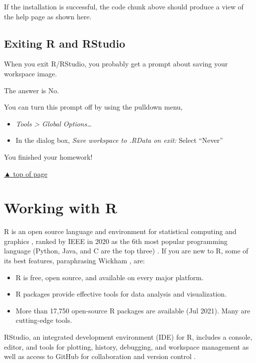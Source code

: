 \documentclass[
]{book}
\providecommand{\tightlist}{%
  \setlength{\itemsep}{0pt}\setlength{\parskip}{0pt}}
\begin{document}
If the installation is successful, the code chunk above should produce a view of the help page as shown here.

\hypertarget{exiting-r-and-rstudio}{%
\section{Exiting R and RStudio}\label{exiting-r-and-rstudio}}

When you exit R/RStudio, you probably get a prompt about saving your workspace image.

The answer is No.~

You can turn this prompt off by using the pulldown menu,

\begin{itemize}
\tightlist
\item
  \emph{Tools \textgreater{} Global Options\ldots{}}
\item
  In the dialog box, \emph{Save workspace to .RData on exit:} Select ``Never''
\end{itemize}

You finished your homework!

\protect\hyperlink{install-everything}{▲ top of page}

\hypertarget{work-with-R}{%
\chapter{Working with R}\label{work-with-R}}

R is an open source language and environment for statistical computing and graphics \citep{R-base}, ranked by IEEE in 2020 as the 6th most popular programming language (Python, Java, and C are the top three) \citep{Cass:2020}. If you are new to R, some of its best features, paraphrasing Wickham \citeyearpar{wickham2014advanced}, are:

\begin{itemize}
\tightlist
\item
  R is free, open source, and available on every major platform.
\item
  R packages provide effective tools for data analysis and visualization.
\item
  More than 17,750 open-source R packages are available (Jul 2021). Many are cutting-edge tools.
\end{itemize}

RStudio, an integrated development environment (IDE) for R, includes a console, editor, and tools for plotting, history, debugging, and workspace management as well as access to GitHub for collaboration and version control \citep{2016rstudio}.
\end{document}
